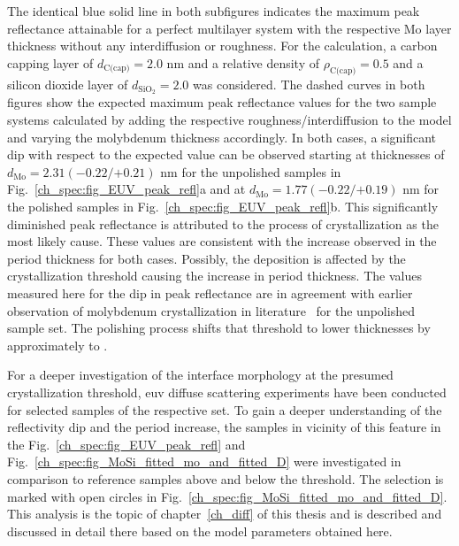The identical blue solid line in both subfigures indicates the maximum peak reflectance attainable for a perfect multilayer system with the respective Mo layer thickness without any interdiffusion or roughness. For the calculation, a carbon capping layer of $d_\text{C(cap)} = 2.0$ nm and a relative density of $\rho_\text{C(cap)} = 0.5$ and a silicon dioxide layer of $d_\text{SiO$_2$} = 2.0$ was considered. The dashed curves in both figures show the expected maximum peak reflectance values for the two sample systems calculated by adding the respective roughness/interdiffusion to the model and varying the molybdenum thickness accordingly. In both cases, a significant dip with respect to the expected value can be observed starting at thicknesses of $d_\text{Mo} = 2.31({-0.22}/{+0.21})$ nm for the unpolished samples in Fig.~\ref{ch_spec:fig_EUV_peak_refl}a and at $d_\text{Mo} = 1.77({-0.22}/{+0.19})$ nm for the polished samples in Fig.~\ref{ch_spec:fig_EUV_peak_refl}b. This significantly diminished peak reflectance is attributed to the process of crystallization as the most likely cause. These values are consistent with the increase observed in the period thickness for both cases. Possibly, the deposition is affected by the crystallization threshold causing the increase in period thickness. The values measured here for the dip in peak reflectance are in agreement with earlier observation of molybdenum crystallization in literature~\cite{bajt_investigation_2001} for the unpolished sample set. The polishing process shifts that threshold to lower thicknesses by approximately  to .

For a deeper investigation of the interface morphology at the presumed crystallization threshold, \gls{euv} diffuse scattering experiments have been conducted for selected samples of the respective set. To gain a deeper understanding of the reflectivity dip and the period increase, the samples in vicinity of this feature in the Fig.~\ref{ch_spec:fig_EUV_peak_refl} and Fig.~\ref{ch_spec:fig_MoSi_fitted_mo_and_fitted_D} were investigated in comparison to reference samples above and below the threshold. The selection is marked with open circles in Fig.~\ref{ch_spec:fig_MoSi_fitted_mo_and_fitted_D}. This analysis is the topic of chapter~\ref{ch_diff} of this thesis and is described and discussed in detail there based on the model parameters obtained here.

 





